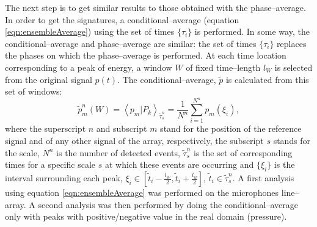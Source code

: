 \documentclass[english]{aiaa-tc}
\begin{document}
The next step is to get similar results to those obtained with the phase--average. In order to get the signatures, a conditional--average (equation \ref{eqn:ensembleAverage}) using the set of times $\{\tau_{i}\}$ is performed. In some way, the conditional--average and phase--average are similar: the set of times $\{\tau_{i}\}$ replaces the phases on which the phase--average is performed. At each time location corresponding to a peak of energy, a window $W$ of fixed time--length $l_{W}$ is selected from the original signal $p \left( t \right)$. The conditional--average, $\tilde{p}$ is calculated from this set of windows:
\begin{equation} \label{eqn:ensembleAverage}
    \tilde{p}^n_{m}\left( W \right) = \left< p_{m} | P_{k} \right>_{\tilde{\tau}^n_{s}} = \frac{1}{N^n} \sum^{N^n}_{i = 1} p_{m}\left(\xi_{i}\right),
\end{equation}
where the superscript $n$ and subscript $m$ stand for the position of the reference signal and of any other signal of the array, respectively, the subscript $s$ stands for the scale, $N^n$ is the number of detected events, $\tilde{\tau}^n_{s}$ is the set of corresponding times for a specific scale $s$ at which these events are occurring and $\{\xi_{i}\}$ is the interval surrounding each peak, $\xi_{i} \in \left[ \tilde{t}_{i} - \frac{l_W}{2}, \tilde{t}_{i} + \frac{l_w}{2} \right]$, $\tilde{t}_{i} \in \tilde{\tau}^n_{s}$.
A first analysis using equation \ref{eqn:ensembleAverage} was performed on the microphones line--array. A second analysis was then performed by doing the conditional--average only with peaks with positive/negative value in the real domain (pressure).
\end{document}
